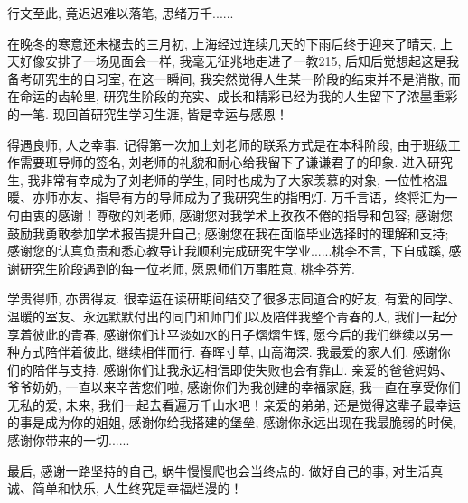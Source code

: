 

\begin{acknowledgement}
行文至此, 竟迟迟难以落笔, 思绪万千......

在晚冬的寒意还未褪去的三月初, 上海经过连续几天的下雨后终于迎来了晴天, 上天好像安排了一场见面会一样, 我毫无征兆地走进了一教215, 后知后觉想起这是我备考研究生的自习室, 在这一瞬间, 我突然觉得人生某一阶段的结束并不是消散, 而在命运的齿轮里, 研究生阶段的充实、成长和精彩已经为我的人生留下了浓墨重彩的一笔. 现回首研究生学习生涯, 皆是幸运与感恩！

得遇良师, 人之幸事. 记得第一次加上刘老师的联系方式是在本科阶段, 由于班级工作需要班导师的签名, 刘老师的礼貌和耐心给我留下了谦谦君子的印象. 进入研究生, 我非常有幸成为了刘老师的学生, 同时也成为了大家羡慕的对象, 一位性格温暖、亦师亦友、指导有方的导师成为了我研究生的指明灯. 万千言语，终将汇为一句由衷的感谢！尊敬的刘老师, 感谢您对我学术上孜孜不倦的指导和包容; 感谢您鼓励我勇敢参加学术报告提升自己; 感谢您在我在面临毕业选择时的理解和支持; 感谢您的认真负责和悉心教导让我顺利完成研究生学业......桃李不言, 下自成蹊, 感谢研究生阶段遇到的每一位老师, 愿恩师们万事胜意, 桃李芬芳.

学贵得师, 亦贵得友. 很幸运在读研期间结交了很多志同道合的好友, 有爱的同学、温暖的室友、永远默默付出的同门和师门们以及陪伴我整个青春的人, 我们一起分享着彼此的青春, 感谢你们让平淡如水的日子熠熠生辉, 愿今后的我们继续以另一种方式陪伴着彼此, 继续相伴而行. 春晖寸草, 山高海深. 我最爱的家人们, 感谢你们的陪伴与支持, 感谢你们让我永远相信即使失败也会有靠山. 亲爱的爸爸妈妈、爷爷奶奶, 一直以来辛苦您们啦, 感谢你们为我创建的幸福家庭, 我一直在享受你们无私的爱, 未来, 我们一起去看遍万千山水吧！亲爱的弟弟, 还是觉得这辈子最幸运的事是成为你的姐姐, 感谢你给我搭建的堡垒, 感谢你永远出现在我最脆弱的时侯, 感谢你带来的一切......

最后, 感谢一路坚持的自己, 蜗牛慢慢爬也会当终点的. 做好自己的事, 对生活真诚、简单和快乐, 人生终究是幸福烂漫的！



\end{acknowledgement}

